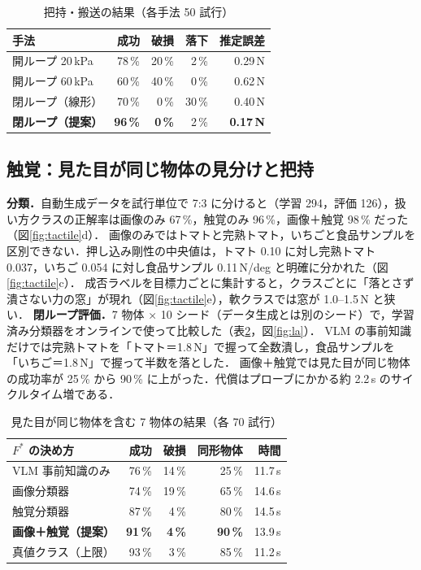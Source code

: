 \documentclass[a4paper,twocolumn,10pt]{ltjsarticle}
\begin{document}
\begin{table}[t]
\centering\small
\caption{把持・搬送の結果（各手法 50 試行）}
\label{tab:res}
\begin{tabular}{@{}lrrrr@{}}
\toprule
手法 & 成功 & 破損 & 落下 & 推定誤差 \\
\midrule
開ループ 20\,kPa & 78\,\% & 20\,\% & 2\,\% & 0.29\,N \\
開ループ 60\,kPa & 60\,\% & 40\,\% & 0\,\% & 0.62\,N \\
閉ループ（線形） & 70\,\% & 0\,\% & 30\,\% & 0.40\,N \\
\textbf{閉ループ（提案）} & \textbf{96\,\%} & \textbf{0\,\%} & 2\,\% & \textbf{0.17\,N} \\
\bottomrule
\end{tabular}
\end{table}

\subsection{触覚：見た目が同じ物体の見分けと把持}
\textbf{分類．}自動生成データを試行単位で 7:3 に分けると（学習 294，評価 126），扱い方クラスの正解率は画像のみ 67\,\%，触覚のみ 96\,\%，画像＋触覚 98\,\% だった（図\ref{fig:tactile}d）．
画像のみではトマトと完熟トマト，いちごと食品サンプルを区別できない．押し込み剛性の中央値は，トマト 0.10 に対し完熟トマト 0.037，いちご 0.054 に対し食品サンプル 0.11\,N/deg と明確に分かれた（図\ref{fig:tactile}c）．
成否ラベルを目標力ごとに集計すると，クラスごとに「落とさず潰さない力の窓」が現れ（図\ref{fig:tactile}e），軟クラスでは窓が 1.0--1.5\,N と狭い．
\textbf{閉ループ評価．}7 物体 × 10 シード（データ生成とは別のシード）で，学習済み分類器をオンラインで使って比較した（表\ref{tab:la}，図\ref{fig:la}）．
VLM の事前知識だけでは完熟トマトを「トマト＝1.8\,N」で握って全数潰し，食品サンプルを「いちご＝1.8\,N」で握って半数を落とした．
画像＋触覚では見た目が同じ物体の成功率が 25\,\% から 90\,\% に上がった．代償はプローブにかかる約 2.2\,s のサイクルタイム増である．

\begin{table}[t]
\centering\small
\caption{見た目が同じ物体を含む 7 物体の結果（各 70 試行）}
\label{tab:la}
\begin{tabular}{@{}lrrrr@{}}
\toprule
$F^*$ の決め方 & 成功 & 破損 & 同形物体 & 時間 \\
\midrule
VLM 事前知識のみ & 76\,\% & 14\,\% & 25\,\% & 11.7\,s \\
画像分類器 & 74\,\% & 19\,\% & 65\,\% & 14.6\,s \\
触覚分類器 & 87\,\% & 4\,\% & 80\,\% & 14.5\,s \\
\textbf{画像＋触覚（提案）} & \textbf{91\,\%} & \textbf{4\,\%} & \textbf{90\,\%} & 13.9\,s \\
真値クラス（上限） & 93\,\% & 3\,\% & 85\,\% & 11.2\,s \\
\bottomrule
\end{tabular}
\end{table}
\end{document}
